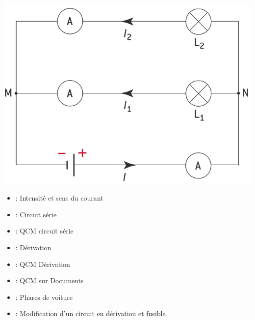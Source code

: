 \documentclass[12pt,a4paper]{article}
\begin{document}
\begin{mybilan}
\begin{itemize}
{			\begin{center}
				\includegraphics[scale=0.35]{img/schema3}
			\end{center}
			
			\vspace*{-1.5cm}
			
			}
	
		
	\end{itemize}
\end{mybilan}


\begin{myex}
		\begin{itemize}
			\item {} : Intensité et sens du courant
			\item {} : Circuit série
			\item {} : QCM circuit série
			\item {} : Dérivation
			\item {} : QCM Dérivation
			\item {} : QCM sur Documents
			\item {} : Phares de voiture
			\item {} : Modification d'un circuit en dérivation et fusible
		\end{itemize}
\end{myex}

\appendix



%
\end{document}
